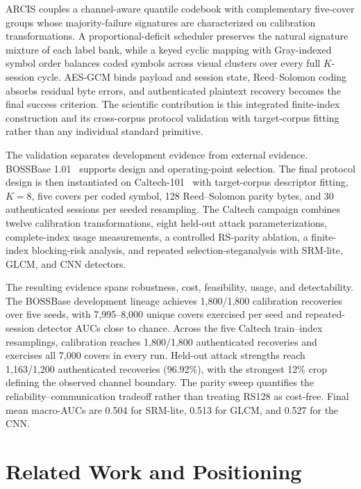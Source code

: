 \documentclass[acmsmall,review,screen]{acmart}
\newcommand{\method}{ARCIS\xspace}
\begin{document}
\method couples a channel-aware quantile codebook with complementary five-cover groups whose majority-failure signatures are characterized on calibration transformations. A proportional-deficit scheduler preserves the natural signature mixture of each label bank, while a keyed cyclic mapping with Gray-indexed symbol order balances coded symbols across visual clusters over every full $K$-session cycle. AES-GCM binds payload and session state, Reed--Solomon coding absorbs residual byte errors, and authenticated plaintext recovery becomes the final success criterion. The scientific contribution is this integrated finite-index construction and its cross-corpus protocol validation with target-corpus fitting rather than any individual standard primitive.

The validation separates development evidence from external evidence. BOSSBase 1.01~\cite{bas2011boss} supports design and operating-point selection. The final protocol design is then instantiated on Caltech-101~\cite{caltech101,feifei2004caltech} with target-corpus descriptor fitting, $K=8$, five covers per coded symbol, 128 Reed--Solomon parity bytes, and 30 authenticated sessions per seeded resampling. The Caltech campaign combines twelve calibration transformations, eight held-out attack parameterizations, complete-index usage measurements, a controlled RS-parity ablation, a finite-index blocking-risk analysis, and repeated selection-steganalysis with SRM-lite, GLCM, and CNN detectors.

The resulting evidence spans robustness, cost, feasibility, usage, and detectability. The BOSSBase development lineage achieves 1,800/1,800 calibration recoveries over five seeds, with 7,995--8,000 unique covers exercised per seed and repeated-session detector AUCs close to chance. Across the five Caltech train--index resamplings, calibration reaches 1,800/1,800 authenticated recoveries and exercises all 7,000 covers in every run. Held-out attack strengths reach 1,163/1,200 authenticated recoveries (96.92\%), with the strongest 12\% crop defining the observed channel boundary. The parity sweep quantifies the reliability--communication tradeoff rather than treating RS128 as cost-free. Final mean macro-AUCs are 0.504 for SRM-lite, 0.513 for GLCM, and 0.527 for the CNN.


\section{Related Work and Positioning}
\end{document}
